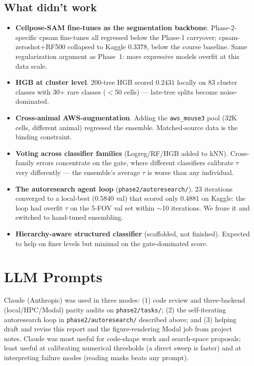 \documentclass[a4paper,11pt]{article}
\begin{document}
\subsection{What didn't work}

\begin{itemize}
    \item \textbf{Cellpose-SAM fine-tunes as the segmentation backbone}. Phase-2-specific cpsam fine-tunes all regressed below the Phase-1 carryover; cpsam-zeroshot$+$RF500 collapsed to Kaggle $0.3378$, below the course baseline. Same regularization argument as Phase~1: more expressive models overfit at this data scale.
    \item \textbf{HGB at cluster level}. 200-tree HGB scored $0.2431$ locally on 83 cluster classes with 30+ rare classes ($<$50 cells) --- late-tree splits become noise-dominated.
    \item \textbf{Cross-animal AWS-augmentation}. Adding the \texttt{aws\_mouse3} pool (32K cells, different animal) regressed the ensemble. Matched-source data is the binding constraint.
    \item \textbf{Voting across classifier families} (Logreg/RF/HGB added to kNN). Cross-family errors concentrate on the gate, where different classifiers calibrate $\tau$ very differently --- the ensemble's average $\tau$ is worse than any individual.
    \item \textbf{The autoresearch agent loop} (\texttt{phase2/autoresearch/}). 23 iterations converged to a local-best ($0.5840$ val) that scored only $0.4881$ on Kaggle: the loop had overfit $\tau$ on the 5-FOV val set within $\sim$10 iterations. We froze it and switched to hand-tuned ensembling.
    \item \textbf{Hierarchy-aware structured classifier} (scaffolded, not finished). Expected to help on finer levels but minimal on the gate-dominated score.
\end{itemize}

\section{LLM Prompts}
\label{sec:llm-prompts}

Claude (Anthropic) was used in three modes: (1) code review and three-backend (local/HPC/Modal) parity audits on \texttt{phase2/tasks/}; (2) the self-iterating autoresearch loop in \texttt{phase2/autoresearch/} described above; and (3) helping draft and revise this report and the figure-rendering Modal job from project notes. Claude was most useful for code-shape work and search-space proposals; least useful at calibrating numerical thresholds (a direct sweep is faster) and at interpreting failure modes (reading masks beats any prompt).
\end{document}
